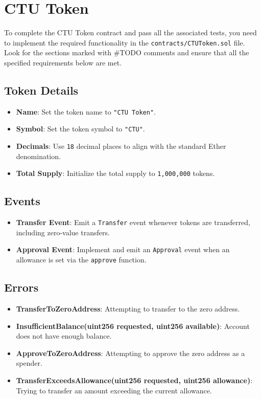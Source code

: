 \documentclass[12pt]{article}
\begin{document}
\section{CTU Token}

To complete the CTU Token contract and pass all the associated tests, you need to implement the required functionality in the \texttt{contracts/CTUToken.sol} file. Look for the sections marked with \#TODO comments and ensure that all the specified requirements below are met.

\subsection*{Token Details}
\begin{itemize}
  \item \textbf{Name}: Set the token name to \texttt{"CTU Token"}.
  \item \textbf{Symbol}: Set the token symbol to \texttt{"CTU"}.
  \item \textbf{Decimals}: Use \texttt{18} decimal places to align with the standard Ether denomination.
  \item \textbf{Total Supply}: Initialize the total supply to \texttt{1,000,000} tokens.
\end{itemize}

\subsection*{Events}
\begin{itemize}
  \item \textbf{Transfer Event}: Emit a \texttt{Transfer} event whenever tokens are transferred, including zero-value transfers.
  \item \textbf{Approval Event}: Implement and emit an \texttt{Approval} event when an allowance is set via the \texttt{approve} function.
\end{itemize}

\subsection*{Errors}
\begin{itemize}
  \item \textbf{TransferToZeroAddress}: Attempting to transfer to the zero address.
  \item \textbf{InsufficientBalance(uint256 requested, uint256 available)}: Account does not have enough balance.
  \item \textbf{ApproveToZeroAddress}: Attempting to approve the zero address as a spender.
  \item \textbf{TransferExceedsAllowance(uint256 requested, uint256 allowance)}: Trying to transfer an amount exceeding the current allowance.
\end{itemize}
\end{document}
